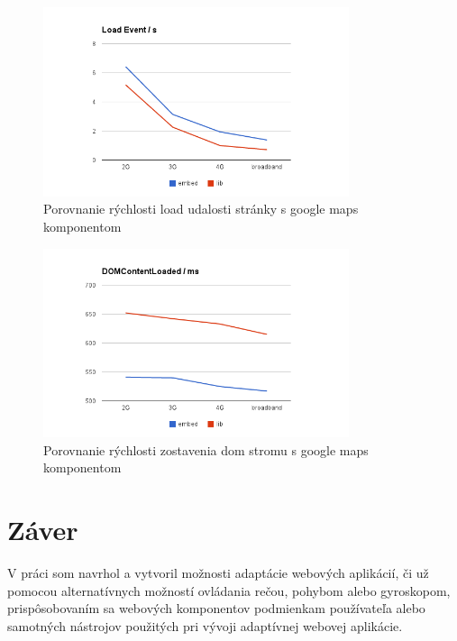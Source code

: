 \begin{figure}[H]
  \centering
  \includegraphics[width=0.8\textwidth]{img/load/gmaps-load.png}
  \caption[Porovnanie rýchlosti load udalosti stránky s google maps komponentom]{
    Porovnanie rýchlosti load udalosti stránky s google maps komponentom}
  \label{fig: gmaps-load}
\end{figure}

\begin{figure}[H]
  \centering
  \includegraphics[width=0.8\textwidth]{img/load/gmaps-dom.png}
  \caption[Porovnanie rýchlosti zostavenia dom stromu s google maps komponentom]{
    Porovnanie rýchlosti zostavenia dom stromu s google maps komponentom}
  \label{fig: gmaps-dom}
\end{figure}





\newpage
\section{Záver} %
\label{sec:z_ver}

V práci som navrhol a vytvoril možnosti adaptácie webových aplikácií, či už pomocou alternatívnych možností ovládania rečou, pohybom alebo gyroskopom, prispôsobovaním sa webových komponentov podmienkam používateľa alebo samotných nástrojov použitých pri vývoji adaptívnej webovej aplikácie.

